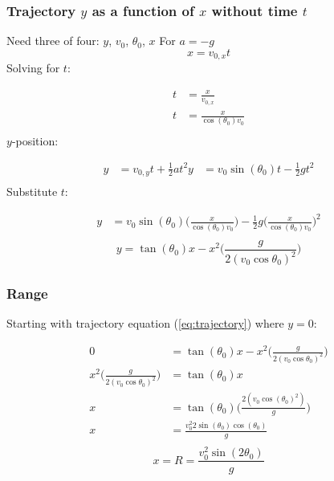 \documentclass{article}
\numberwithin{equation}{section}
\begin{document}
 \subsubsection{Trajectory $y$ as a function of $x$ without time $t$}
 Need three of four: $y$, $v_{0}$, $\theta_{0}$, $x$
 For $a = -g$
 \[
    x = v_{0,x}t
\] 
Solving for $t$:
 
\[
  \begin{aligned}
    t &= \frac{x}{v_{0,x}} \\
    t &= \frac{x}{\cos(\theta_{0})v_{0}} \\
  \end{aligned}
\]
$y$-position:
 
\[
  \begin{aligned}
    y &= v_{0,y}t + \frac{1}{2}at^2
    y &= v_{0}\sin(\theta_{0})t - \frac{1}{2}gt^2 \\
  \end{aligned}
\]
Substitute $t$:
 
\[
  \begin{aligned}
    y &= v_{0}\sin(\theta_{0}) \bigg( \frac{x}{\cos(\theta_{0})v_{0}} \bigg) -
    \frac{1}{2}g \bigg( \frac{x}{\cos(\theta_{0})v_{0}} \bigg)^2 \\
  \end{aligned}
\]
\begin{equation}\label{eq:trajectory}
  \boxed{    y = \tan(\theta_{0})x - x^2 \bigg( \frac{g}{2(v_{0} \cos\theta_{0} )^2} \bigg)}
\end{equation}
 \subsubsection{Range}
 Starting with trajectory equation (\ref{eq:trajectory}) where $y=0$:
 
\[
  \begin{aligned}
    0 &= \tan(\theta_{0})x - x^2 \bigg( \frac{g}{2(v_{0} \cos\theta_{0} )^2} \bigg) \\
    x^2 \bigg( \frac{g}{2(v_{0} \cos\theta_{0} )^2} \bigg) &=
    \tan(\theta_{0})x\\
    x  &= \tan(\theta_{0}) \bigg( \frac{2(v_{0}\cos(\theta_{0})^2)}{g} \bigg) \\
    x &= \frac{v_{0}^2 2\sin(\theta_{0})\cos(\theta_{0})}{g}\\ 
  \end{aligned}
\]
  \begin{equation}\label{eq:range}
    \boxed{    x = R = \frac{v_{0}^2 \sin(2\theta_{0})}{g} }
  \end{equation}
\end{document}

